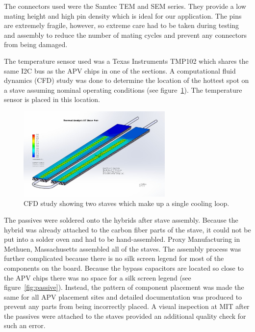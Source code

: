 \documentclass[preprint,12pt]{elsarticle}
\begin{document}
The connectors used were the Samtec TEM and SEM series. They provide a low
mating height and high pin density which is ideal for our application. The
pins are extremely fragile, however, so extreme care had to be taken during
testing and assembly to reduce the number of mating cycles and prevent any
connectors from being damaged.

The temperature sensor used was a Texas Instruments TMP102 which shares the same
I2C bus as the APV chips in one of the sections. A computational fluid dynamics (CFD) study was done to
determine the location of the hottest spot on a stave assuming nominal operating
conditions (see figure~\ref{fig:cfd}). The temperature sensor is placed in this location.

\begin{figure}[ht]
\begin{center}
\includegraphics[width=3in, keepaspectratio=true, angle=0]{graphics/cfd.jpg}
\caption{CFD study showing two staves which make up a single cooling loop.
\label{fig:cfd}}
\end{center}
\end{figure}
%
The passives were soldered onto the hybrids after stave assembly. Because the
hybrid was already attached to the carbon fiber parts of the stave, it
could not be put into a solder oven and had to be hand-assembled. Proxy
Manufacturing in Methuen, Massachusetts assembled all of the staves. The
assembly process was further complicated because there is no silk screen
legend for most of the components on the board. Because the bypass capacitors
are located so close to the APV chips there was no space for a silk screen
legend (see figure~\ref{fig:passive}). Instead, the pattern of component placement was made the same for all
APV placement sites and detailed documentation was produced to prevent any parts
from being incorrectly placed. A visual inspection at MIT after the
passives were attached to the staves provided an additional quality check for
such an error.
\end{document}
